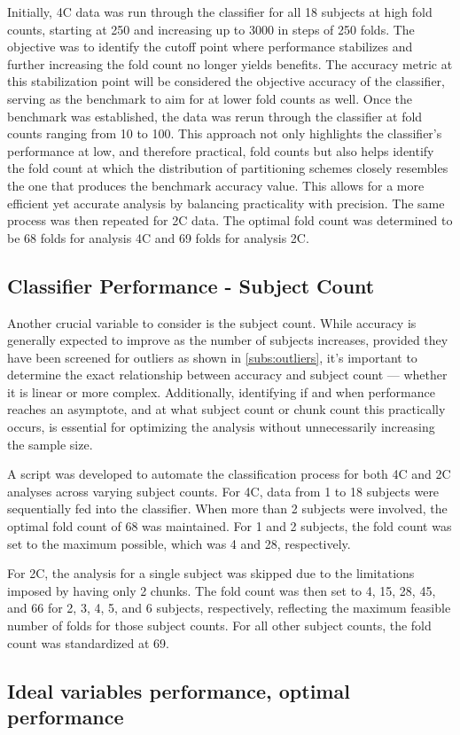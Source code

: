 Initially, \gls{4C} data was run through the classifier for all 18 subjects at high fold counts, starting at 250 and increasing up to 3000 in steps of 250 folds. The objective was to identify the cutoff point where performance stabilizes and further increasing the fold count no longer yields benefits. The accuracy metric at this stabilization point will be considered the objective accuracy of the classifier, serving as the benchmark to aim for at lower fold counts as well. Once the benchmark was established, the data was rerun through the classifier at fold counts ranging from 10 to 100. This approach not only highlights the classifier's performance at low, and therefore practical, fold counts but also helps identify the fold count at which the distribution of partitioning schemes closely resembles the one that produces the benchmark accuracy value. This allows for a more efficient yet accurate analysis by balancing practicality with precision. The same process was then repeated for \gls{2C} data. The optimal fold count was determined to be 68 folds for analysis \gls{4C} and 69 folds for analysis \gls{2C}. 

\subsection{Classifier Performance - Subject Count}

Another crucial variable to consider is the subject count. While accuracy is generally expected to improve as the number of subjects increases, provided they have been screened for outliers as shown in \autoref{subs:outliers}, it's important to determine the exact relationship between accuracy and subject count --- whether it is linear or more complex. Additionally, identifying if and when performance reaches an asymptote, and at what subject count or chunk count this practically occurs, is essential for optimizing the analysis without unnecessarily increasing the sample size.

A script was developed to automate the classification process for both \gls{4C} and \gls{2C} analyses across varying subject counts. For \gls{4C}, data from 1 to 18 subjects were sequentially fed into the classifier. When more than 2 subjects were involved, the optimal fold count of 68 was maintained. For 1 and 2 subjects, the fold count was set to the maximum possible, which was 4 and 28, respectively.

For \gls{2C}, the analysis for a single subject was skipped due to the limitations imposed by having only 2 chunks. The fold count was then set to 4, 15, 28, 45, and 66 for 2, 3, 4, 5, and 6 subjects, respectively, reflecting the maximum feasible number of folds for those subject counts. For all other subject counts, the fold count was standardized at 69.


\subsection{Ideal variables performance, optimal performance}
